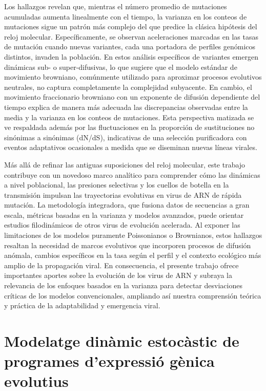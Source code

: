 Los hallazgos revelan que, mientras el número promedio de mutaciones acumuladas aumenta linealmente con el tiempo, la varianza en los conteos de mutaciones sigue un patrón más complejo del que predice la clásica hipótesis del reloj molecular. Específicamente, se observan aceleraciones marcadas en las tasas de mutación cuando nuevas variantes, cada una portadora de perfiles genómicos distintos, invaden la población. En estos análisis específicos de variantes emergen dinámicas sub- o super-difusivas, lo que sugiere que el modelo estándar de movimiento browniano, comúnmente utilizado para aproximar procesos evolutivos neutrales, no captura completamente la complejidad subyacente. En cambio, el movimiento fraccionario browniano con un exponente de difusión dependiente del tiempo explica de manera más adecuada las discrepancias observadas entre la media y la varianza en los conteos de mutaciones. Esta perspectiva matizada se ve respaldada además por las fluctuaciones en la proporción de sustituciones no sinónimas a sinónimas (dN/dS), indicativas de una selección purificadora con eventos adaptativos ocasionales a medida que se diseminan nuevas líneas virales.

Más allá de refinar las antiguas suposiciones del reloj molecular, este trabajo contribuye con un novedoso marco analítico para comprender cómo las dinámicas a nivel poblacional, las presiones selectivas y los cuellos de botella en la transmisión impulsan las trayectorias evolutivas en virus de ARN de rápida mutación. La metodología integradora, que fusiona datos de secuencias a gran escala, métricas basadas en la varianza y modelos avanzados, puede orientar estudios filodinámicos de otros virus de evolución acelerada. Al exponer las limitaciones de los modelos puramente Poissonianos o Brownianos, estos hallazgos resaltan la necesidad de marcos evolutivos que incorporen procesos de difusión anómala, cambios específicos en la tasa según el perfil y el contexto ecológico más amplio de la propagación viral. En consecuencia, el presente trabajo ofrece importantes aportes sobre la evolución de los virus de ARN y subraya la relevancia de los enfoques basados en la varianza para detectar desviaciones críticas de los modelos convencionales, ampliando así nuestra comprensión teórica y práctica de la adaptabilidad y emergencia viral.

\vfill

\chapter*{\Large Modelatge dinàmic estocàstic de programes d'expressió gènica evolutius}

